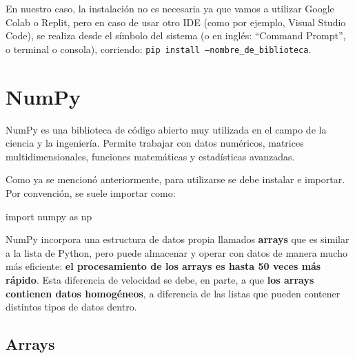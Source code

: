 \documentclass[
  letterpaper,
  DIV=11,
  numbers=noendperiod]{scrreprt}
\newenvironment{Shaded}{\begin{snugshade}}{\end{snugshade}}
\newcommand{\ImportTok}[1]{\textcolor[rgb]{0.00,0.46,0.62}{#1}}
\newcommand{\NormalTok}[1]{\textcolor[rgb]{0.00,0.23,0.31}{#1}}
\begin{document}
\begin{tcolorbox}[enhanced jigsaw, bottomrule=.15mm, leftrule=.75mm, opacityback=0, colback=white, toprule=.15mm, bottomtitle=1mm, opacitybacktitle=0.6, rightrule=.15mm, left=2mm, arc=.35mm, coltitle=black, title=\textcolor{quarto-callout-note-color}{\faInfo}\hspace{0.5em}{Note}, breakable, toptitle=1mm, colframe=quarto-callout-note-color-frame, titlerule=0mm, colbacktitle=quarto-callout-note-color!10!white]

En nuestro caso, la instalación no es necesaria ya que vamos a utilizar
Google Colab o Replit, pero en caso de usar otro IDE (como por ejemplo,
Visual Studio Code), se realiza desde el símbolo del sistema (o en
inglés: ``Command Prompt'', o terminal o consola), corriendo:
\texttt{pip\ install\ –nombre\_de\_biblioteca}.

\end{tcolorbox}

\section{NumPy}\label{numpy}

NumPy es una biblioteca de código abierto muy utilizada en el campo de
la ciencia y la ingeniería. Permite trabajar con datos numéricos,
matrices multidimensionales, funciones matemáticas y estadísticas
avanzadas.

Como ya se mencionó anteriormente, para utilizarse se debe instalar e
importar. Por convención, se suele importar como:

\begin{Shaded}
\begin{Highlighting}[]
\ImportTok{import}\NormalTok{ numpy }\ImportTok{as}\NormalTok{ np}
\end{Highlighting}
\end{Shaded}

NumPy incorpora una estructura de datos propia llamados \textbf{arrays}
que es similar a la lista de Python, pero puede almacenar y operar con
datos de manera mucho más eficiente: \textbf{el procesamiento de los
arrays es hasta 50 veces más rápido}. Esta diferencia de velocidad se
debe, en parte, a que \textbf{los arrays contienen datos homogéneos}, a
diferencia de las listas que pueden contener distintos tipos de datos
dentro.

\subsection{\texorpdfstring{\textbf{Arrays}}{Arrays}}\label{arrays}
\end{document}
